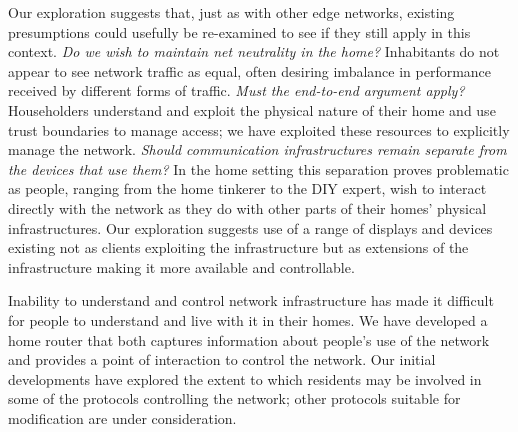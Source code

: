 Our exploration suggests that, just as with other edge networks, existing
presumptions could usefully be re-examined to see if they still apply in this
context.  \emph{Do we wish to maintain net neutrality in the home?}
Inhabitants do not appear to see network traffic as equal, often desiring
imbalance in performance received by different forms of traffic.  \emph{Must
the end-to-end argument apply?} Householders understand and exploit the
physical nature of their home and use trust boundaries to manage access; we
have exploited these resources to explicitly manage the network.  \emph{Should
communication infrastructures remain separate from the devices that use them?}
In the home setting this separation proves problematic as people, ranging from
the home tinkerer to the DIY expert, wish to interact directly with the
network as they do with other parts of their homes' physical infrastructures.
Our exploration suggests use of a range of displays and devices existing not
as clients exploiting the infrastructure but as extensions of the
infrastructure making it more available and controllable.

Inability to understand and control network infrastructure has made it
difficult for people to understand and live with it in their homes.  We have
developed a home router that both captures information about people's use of
the network and provides a point of interaction to control the network.  Our
initial developments have explored the extent to which residents may be
involved in some of the protocols controlling the network; other protocols
suitable for modification are under consideration.

